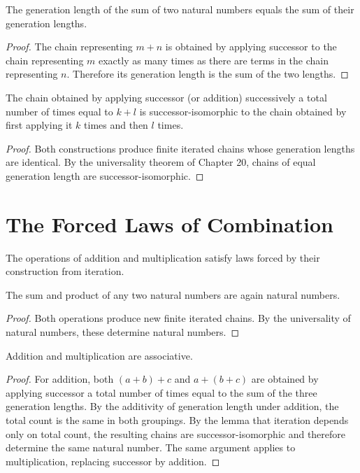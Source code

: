 \documentclass[12pt,anyside]{book}
\begin{document}
\begin{lemma}
The generation length of the sum of two natural numbers equals the sum of their generation lengths.
\end{lemma}

\begin{proof}
The chain representing $m + n$ is obtained by applying successor to the chain representing $m$ exactly as many times as there are terms in the chain representing $n$. Therefore its generation length is the sum of the two lengths.
\end{proof}

\begin{lemma}
The chain obtained by applying successor (or addition) successively a total number of times equal to $k + l$ is successor-isomorphic to the chain obtained by first applying it $k$ times and then $l$ times.
\end{lemma}

\begin{proof}
Both constructions produce finite iterated chains whose generation lengths are identical. By the universality theorem of Chapter 20, chains of equal generation length are successor-isomorphic.
\end{proof}

\section{The Forced Laws of Combination}
The operations of addition and multiplication satisfy laws forced by their construction from iteration.

\begin{theorem}[Closure]
The sum and product of any two natural numbers are again natural numbers.
\end{theorem}

\begin{proof}
Both operations produce new finite iterated chains. By the universality of natural numbers, these determine natural numbers.
\end{proof}

\begin{theorem}[Associativity]
Addition and multiplication are associative.
\end{theorem}

\begin{proof}
For addition, both $(a + b) + c$ and $a + (b + c)$ are obtained by applying successor a total number of times equal to the sum of the three generation lengths. By the additivity of generation length under addition, the total count is the same in both groupings. By the lemma that iteration depends only on total count, the resulting chains are successor-isomorphic and therefore determine the same natural number. The same argument applies to multiplication, replacing successor by addition.
\end{proof}
\end{document}
